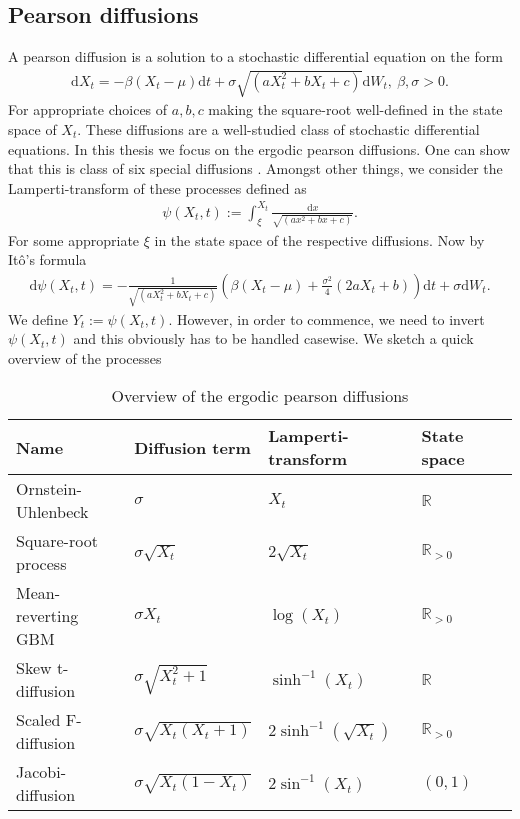 \subsection{Pearson diffusions}
A pearson diffusion is a solution to a stochastic differential equation on the form
\begin{align}
    \mathrm{d}X_t = -\beta \left(X_t - \mu\right)\mathrm{d}t + \sigma\sqrt{\left(aX_t^2 + bX_t + c\right)}\mathrm{d}W_t, \: \beta, \sigma > 0.
\end{align}
For appropriate choices of $a, b, c$ making the square-root well-defined in the state space of $X_t$. These diffusions are a well-studied class of stochastic differential equations. In this thesis we focus on the ergodic pearson diffusions. One can show that this is class of six special diffusions \cite[p.36]{StatisticalMethodsForSDE}. Amongst other things, we consider the Lamperti-transform of these processes defined as
\begin{align}
    \psi\left(X_t, t\right) := \int_{\xi}^{X_t} \frac{\mathrm{d}x}{\sqrt{\left(ax^2 + bx + c\right)}}. \label{eq:lampertiDefinition}
\end{align}
For some appropriate $\xi$ in the state space of the respective diffusions. Now by Itô's formula
\begin{align}
    \mathrm{d}\psi\left(X_t, t\right) = - \frac{1}{\sqrt{\left(aX_t^2 + bX_t + c\right)}}\left(\beta\left(X_t - \mu\right) + \frac{\sigma^2}{4}\left(2aX_t + b\right)\right)\mathrm{d}t + \sigma \mathrm{d}W_t.
\end{align}
We define $Y_t := \psi\left(X_t, t\right)$. However, in order to commence, we need to invert $\psi\left(X_t, t\right)$ and this obviously has to be handled casewise. We sketch a quick overview of the processes
\begin{table}[h!]
    \begin{center}
    \begin{tabular}{lllll}\hline
    \textbf{Name} & \textbf{Diffusion term} & \textbf{Lamperti-transform} & \textbf{State space}\\ \hline
    Ornstein-Uhlenbeck  & $\sigma$  & $X_t$ & $\mathbb{R}$ \\
    Square-root process & $\sigma\sqrt{X_t}$  & $ 2\sqrt{X_t}$ & $\mathbb{R}_{>0}$ \\
    Mean-reverting GBM  & $\sigma X_t $  & $ \log\left(X_t\right)$  & $\mathbb{R}_{>0}$ \\
    Skew t-diffusion  & $\sigma\sqrt{X_t^2 + 1}$  & $ \sinh^{-1}(X_t)$ & $\mathbb{R}$\\
    Scaled F-diffusion  & $\sigma\sqrt{X_t\left(X_t + 1\right)}$  & $ 2\sinh^{-1}\left(\sqrt{X_t}\right)$ & $\mathbb{R}_{>0}$ \\
    Jacobi-diffusion  & $\sigma\sqrt{X_t\left(1 - X_t\right)}$  & $ 2\sin^{-1}\left(X_t\right)$ & $(0, 1)$ \\ \hline
    \end{tabular}
    \caption{Overview of the ergodic pearson diffusions}
\end{center}
\end{table}\\
